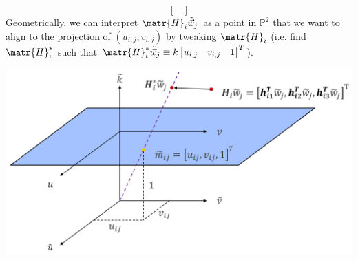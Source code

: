\begin{description}
\begin{description}
\[{\begin{bmatrix}
                        \end{bmatrix}}
                \]
                Geometrically, we can interpret $\matr{H}_i \tilde{\vec{w}}_j$ as a point in $\mathbb{P}^2$
                that we want to align to the projection of $(u_{i,j}, v_{i,j})$ by tweaking $\matr{H}_i$
                (i.e. find $\matr{H}_i^*$ such that $\matr{H}_i^* \tilde{\vec{w}}_j \equiv k \begin{bmatrix} u_{i,j} & v_{i,j} & 1 \end{bmatrix}^T$).
                \begin{center}
                    \includegraphics[width=0.7\linewidth]{./img/_zhang_corner_homography.pdf}
                \end{center}


\end{description}
\end{description}
